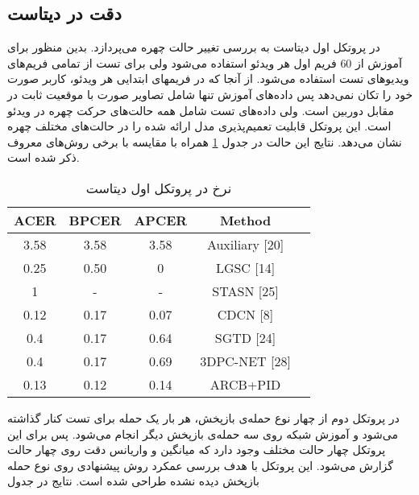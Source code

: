 \subsection{دقت در دیتاست }
در پروتکل اول دیتاست  به بررسی تغییر حالت چهره می‌پردازد. بدین منظور برای آموزش از 60 فریم اول هر ویدئو استفاده می‌شود ولی برای تست از تمامی فریم‌های ویدیوهای تست استفاده می‌شود. از آنجا که در فریم­های ابتدایی هر ویدئو، کاربر صورت خود را تکان نمی‌دهد پس داده‌های آموزش تنها شامل تصاویر صورت با موقعیت ثابت در مقابل دوربین است. ولی داده‌های تست شامل همه حالت‌های حرکت چهره در ویدئو است. این پروتکل قابلیت تعمیم‌پذیری مدل ارائه شده را در حالت‌های مختلف چهره نشان می‌دهد. نتایج این حالت در جدول
\ref{tab:siw1}
همراه با مقایسه با برخی روش‌های معروف ذکر شده است.
\begin{table}[ht]
	\caption{نرخ در پروتکل اول دیتاست }
	\label{tab:siw1}
	\centering
	\onehalfspacing
	\begin{tabular}{|c|c|c|c|c|}
	\hline ACER & BPCER & APCER & Method                \\
	\hline 3.58 & 3.58  & 3.58  & Auxiliary {[}20{]}   \\
	\hline 0.25 & 0.50  & 0     & LGSC {[}14{]}          \\
	\hline 1    & -     & -     & STASN {[}25{]}       \\
	\hline 0.12 & 0.17  & 0.07  & CDCN {[}8{]}            \\
	\hline 0.4  & 0.17  & 0.64  & SGTD 				{[}24{]}      \\
	\hline 0.4  & 0.17  & 0.69  & 3DPC-NET 				{[}28{]}   \\
	\hline 0.13 & 0.12  & 0.14  & ARCB+PID    \\ 
	 \hline         
	\end{tabular}
\end{table}

در پروتکل دوم از چهار نوع حمله‌ی بازپخش، هر بار یک حمله برای تست کنار گذاشته می‌شود و آموزش شبکه روی سه حمله‌ی بازپخش دیگر انجام می‌شود. پس برای این پروتکل چهار حالت مختلف وجود دارد که میانگین و واریانس دقت روی چهار حالت گزارش می‌شود. این پروتکل با هدف بررسی عمکرد روش پیشنهادی روی نوع حمله بازپخش دیده نشده طراحی شده است. نتایج در جدول 

